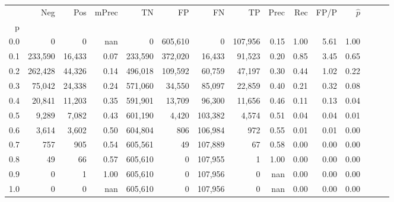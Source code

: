 \begin{tabular}{rrrrrrrrrrrrrrr}
\toprule
{} &      Neg &     Pos & mPrec &       TN &       FP &       FN &       TP &  Prec &   Rec &  FP/P & $\hat{p}$ \\
p   &          &         &       &          &          &          &          &       &       &       &           \\
\midrule
0.0 &        0 &       0 &   nan &        0 &  605,610 &        0 &  107,956 &  0.15 &  1.00 &  5.61 &      1.00 \\
0.1 &  233,590 &  16,433 &  0.07 &  233,590 &  372,020 &   16,433 &   91,523 &  0.20 &  0.85 &  3.45 &      0.65 \\
0.2 &  262,428 &  44,326 &  0.14 &  496,018 &  109,592 &   60,759 &   47,197 &  0.30 &  0.44 &  1.02 &      0.22 \\
0.3 &   75,042 &  24,338 &  0.24 &  571,060 &   34,550 &   85,097 &   22,859 &  0.40 &  0.21 &  0.32 &      0.08 \\
0.4 &   20,841 &  11,203 &  0.35 &  591,901 &   13,709 &   96,300 &   11,656 &  0.46 &  0.11 &  0.13 &      0.04 \\
0.5 &    9,289 &   7,082 &  0.43 &  601,190 &    4,420 &  103,382 &    4,574 &  0.51 &  0.04 &  0.04 &      0.01 \\
0.6 &    3,614 &   3,602 &  0.50 &  604,804 &      806 &  106,984 &      972 &  0.55 &  0.01 &  0.01 &      0.00 \\
0.7 &      757 &     905 &  0.54 &  605,561 &       49 &  107,889 &       67 &  0.58 &  0.00 &  0.00 &      0.00 \\
0.8 &       49 &      66 &  0.57 &  605,610 &        0 &  107,955 &        1 &  1.00 &  0.00 &  0.00 &      0.00 \\
0.9 &        0 &       1 &  1.00 &  605,610 &        0 &  107,956 &        0 &   nan &  0.00 &  0.00 &      0.00 \\
1.0 &        0 &       0 &   nan &  605,610 &        0 &  107,956 &        0 &   nan &  0.00 &  0.00 &      0.00 \\
\bottomrule
\end{tabular}
